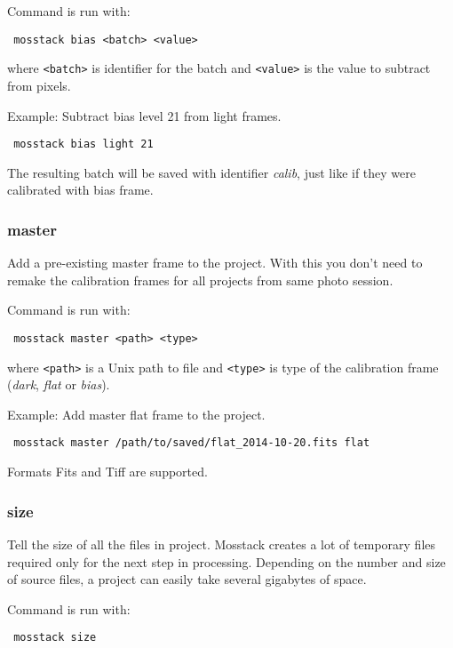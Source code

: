 \documentclass[twoside,a4paper]{refart}
\begin{document}
Command is run with:
\begin{verbatim}
 mosstack bias <batch> <value>
\end{verbatim}

where \texttt{<batch>} is identifier for the batch and \texttt{<value>} is the value to subtract from pixels.

Example: Subtract bias level 21 from light frames.

\begin{verbatim}
 mosstack bias light 21
\end{verbatim}

The resulting batch will be saved with identifier \textit{calib}, just like if they were calibrated with bias
frame.


\subsubsection{master}
Add a pre-existing master frame to the project. With this you don't need to remake the calibration frames for
all projects from same photo session.

Command is run with:
\begin{verbatim}
 mosstack master <path> <type>
\end{verbatim}

where \texttt{<path>} is a Unix path to file and \texttt{<type>} is type of the calibration frame (\textit{dark},
\textit{flat} or \textit{bias}).

Example: Add master flat frame to the project.

\begin{verbatim}
 mosstack master /path/to/saved/flat_2014-10-20.fits flat
\end{verbatim}

Formats Fits and Tiff are supported.


\subsubsection{size}
Tell the size of all the files in project. Mosstack creates a lot of temporary files required only for the next
step in processing. Depending on the number and size of source files, a project can easily take several gigabytes
of space.

Command is run with:
\begin{verbatim}
 mosstack size
\end{verbatim}
\end{document}
